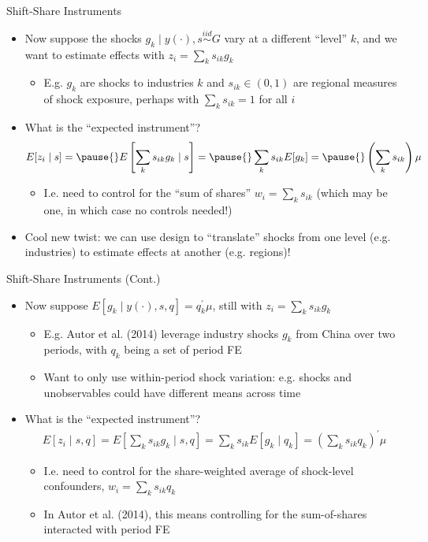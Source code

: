 \documentclass[11pt,english]{beamer}
\begin{document}
\begin{frame}{Shift-Share Instruments}
\begin{itemize}
\item Now suppose the shocks $g_k\mid y(\cdot),s\stackrel{iid}{\sim} G$ vary at a different ``level'' $k$, and we want to estimate effects with $z_i=\sum_k s_{ik} g_k$\smallskip\pause{}
\begin{itemize}
\item E.g. $g_k$ are shocks to industries $k$ and $s_{ik}\in(0,1)$ are regional measures of shock exposure, perhaps with $\sum_k s_{ik}=1$ for all $i$
\end{itemize}\bigskip\pause{}
\item What is the ``expected instrument''?
\begin{align*}
E[z_i\mid s]=\pause{} E\left[\sum_k s_{ik} g_k\mid s\right]=\pause{}\sum_k s_{ik} E[g_k] =\pause{} \left(\sum_k s_{ik}\right)\mu
\end{align*}\pause{}
\begin{itemize}
\item I.e. need to control for the ``sum of shares'' $w_i=\sum_k s_{ik}$ (which may be one, in which case no controls needed!)
\end{itemize}\bigskip\pause{}
\item Cool new twist: we can use design to ``translate'' shocks from one level (e.g. industries) to estimate effects at another (e.g. regions)!
\end{itemize}
\end{frame}

\begin{frame}{Shift-Share Instruments (Cont.)}
\begin{itemize}
\item Now suppose $E[g_k\mid y(\cdot),s,q]=q_k^\prime \mu$, still with $z_i=\sum_k s_{ik} g_k$\smallskip\pause{}
\begin{itemize}
\item E.g. Autor et al. (2014) leverage industry shocks $g_k$ from China over two periods, with $q_k$ being a set of period FE\smallskip\pause{}
\item Want to only use within-period shock variation: e.g. shocks and unobservables could have different means across time
\end{itemize}\bigskip\pause{}
\item What is the ``expected instrument''?
\begin{align*}
E[z_i\mid s,q]= E\left[\sum_k s_{ik} g_k\mid s,q\right]=\sum_k s_{ik} E[g_k\mid q_k] =\left(\sum_k s_{ik}q_k\right)^\prime\mu
\end{align*}\pause{}
\begin{itemize}
\item I.e. need to control for the share-weighted average of shock-level confounders, $w_i=\sum_k s_{ik}q_k$\smallskip\pause{}
\item In Autor et al. (2014), this means controlling for the sum-of-shares interacted with period FE
\end{itemize}
\end{itemize}
\end{frame}
\end{document}
